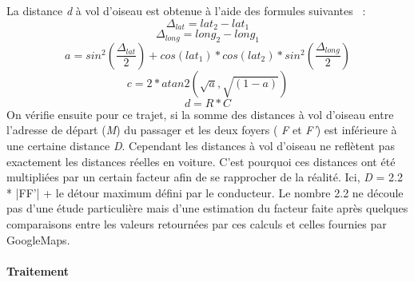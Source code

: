 \documentclass[12pt, a4paper, oneside]{article}
\begin{document}
{{     La distance \textit{d} à vol d'oiseau est obtenue à l'aide des formules suivantes ~\cite{haversine-script}:
    \begin{equation*}
        \Delta_{lat} = lat_{2} - lat_{1}
    \end{equation*}
    \begin{equation*}
        \Delta_{long} = long_{2} - long_{1}
    \end{equation*}
    \begin{equation*}
        a = sin^{2}(\frac{\Delta_{lat}}{2}) + cos(lat_{1}) * cos(lat_{2}) * sin^{2}(\frac{\Delta_{long}}{2})
    \end{equation*}
     \begin{equation*}
         c = 2 * atan2(\sqrt{a},\sqrt{(1-a)})
     \end{equation*}
     \begin{equation*}
        d = R * C
     \end{equation*}     
     On vérifie ensuite pour ce trajet, si la somme des distances à vol d'oiseau entre l'adresse de départ (\textit{M}) du passager et les deux foyers ( \textit{F} et \textit{F'}) est inférieure à une certaine distance \textit{D}. Cependant les distances à vol d'oiseau ne reflètent pas exactement les distances réelles en voiture. C'est pourquoi ces distances ont été multipliées par un certain facteur afin de se rapprocher de la réalité. Ici, \textit{D} = 2.2 * |FF'| + le détour maximum défini par le conducteur. Le nombre 2.2 ne découle pas d'une étude particulière mais d'une estimation du facteur faite après quelques comparaisons entre les valeurs retournées par ces calculs et celles fournies par GoogleMaps.\\\\
     \textbf{Traitement}\\\\
}}
\end{document}
